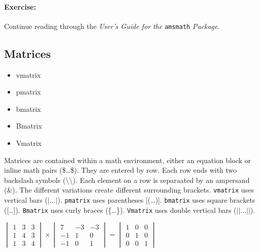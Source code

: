 		\paragraph{Exercise:}Continue reading through the \textit{User's Guide for the }\texttt{amsmath} \textit{Package}.

        \subsection{Matrices}
        \label{Matrices}
        
        \begin{framed}
            \begin{itemize}
                \item{vmatrix}
                \item{pmatrix}
                \item{bmatrix}
                \item{Bmatrix}
                \item{Vmatrix}
            \end{itemize}
        \end{framed}

        Matrices are contained within a math environment, either an equation block or inline math pairs (\$\ldots\$). They are entered by row. Each row ends with two backslash symbols (\textbackslash\textbackslash). Each element on a row is separaated by an ampersand (\&). The different variations create different surrounding brackets.
        \texttt{vmatrix} uses vertical bars ($|\ldots|$).
        \texttt{pmatrix} uses parentheses [(\ldots)].
        \texttt{bmatrix} uses square brackets ([\ldots]).
        \texttt{Bmatrix} uses curly braces (\{\ldots\}).
        \texttt{Vmatrix} uses double vertical bars ($||\ldots||$).

        $ \begin{vmatrix}
            1 & 3 & 3 \\
            1 & 4 & 3 \\
            1 & 3 & 4 
        \end{vmatrix}
         \times 
         \begin{vmatrix}
             7 & -3 & -3 \\
             -1 & 1 & 0 \\
             -1 & 0 & 1
         \end{vmatrix}
         =
         \begin{vmatrix}
             1 & 0 & 0 \\
             0 & 1 & 0 \\
             0 & 0 & 1
         \end{vmatrix} $

